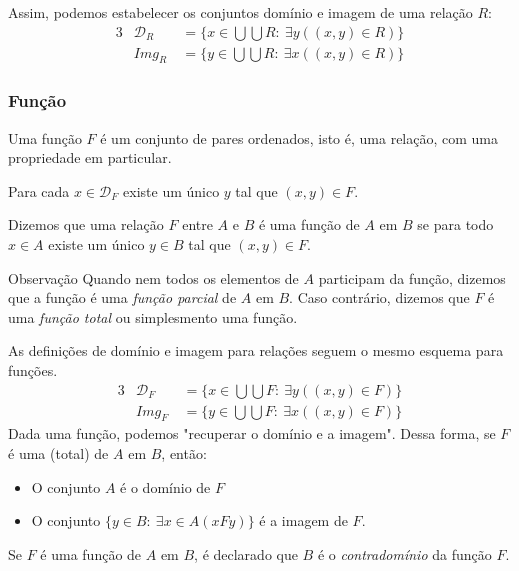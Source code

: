          Assim, podemos estabelecer os conjuntos domínio e imagem de uma relação $R$:
         \begin{alignat*}{3}
            & \mathcal{D}_{R}& \ = \{x \in \bigcup \bigcup R:\ \exists y (( x, y ) \in R) \}\\
            & \mathit{Img}_{R}& \ = \{y \in \bigcup \bigcup R:\ \exists x (( x, y ) \in R)\}
         \end{alignat*}

      \subsubsection{Função}
         Uma função $F$ é um conjunto de pares ordenados, isto é, uma relação, com uma propriedade em particular.
         \begin{stat}
            Para cada $x \in \mathcal{D}_{F}$ existe um único $y$ tal que $( x, y ) \in F.$
         \end{stat}
         \begin{definition}
            Dizemos que uma relação $F$ entre $A$ e $B$ é uma função de $A$ em $B$ se para todo $x \in A$ existe um único $y \in B$ tal que $( x, y ) \in F.$ 
         \end{definition}
         \begin{mymdframed}{Observação}
            Quando nem todos os elementos de $A$ participam da função, dizemos que a função é uma \emph{função parcial} de $A$ em $B$. Caso contrário, dizemos que $F$ é uma \emph{função total} ou simplesmento uma função.
         \end{mymdframed}
         As definições de domínio e imagem para relações seguem o mesmo esquema para funções.
         \begin{alignat*}{3}
            & \mathcal{D}_{F}& \ = \{x \in \bigcup \bigcup F:\ \exists y (( x, y ) \in F) \}\\
            & \mathit{Img}_{F}& \ = \{y \in \bigcup \bigcup F:\ \exists x (( x, y ) \in F)\}
         \end{alignat*}
         Dada uma função, podemos "recuperar o domínio e a imagem". Dessa forma, se $F$ é uma (total) de $A$ em $B$, então:
         \begin{itemize}
            \item O conjunto $A$ é o domínio de $F$
            \item O conjunto $\{y \in B:\ \exists x \in A(xFy)\}$ é a imagem de $F.$
         \end{itemize}
         \begin{definition}[Contradomínio]
            Se $F$ é uma função de $A$ em $B$, é declarado que $B$ é o \emph{contradomínio} da função $F$.  
         \end{definition}
